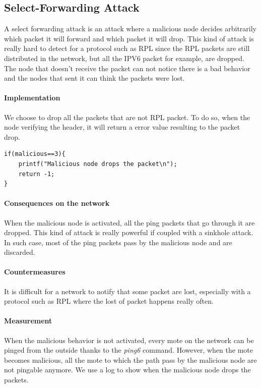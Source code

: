 \documentclass[11pt]{report}
\begin{document}
\subsection{Select-Forwarding Attack}

A select forwarding attack is an attack where a malicious node decides
arbitrarily which packet it will forward and which packet it will drop.
This kind of attack is really hard to detect for a protocol such as
\textsc{RPL} since the \textsc{RPL} packets are still distributed in the
network, but all the IPV6 packet for example, are dropped. The node that
doesn't receive the packet can not notice there is a bad behavior and
the nodes that sent it can think the packets were lost. 


\paragraph{Implementation}
We choose to drop all the packets that are not \textsc{RPL} packet.
To do so, when the node verifying the header, it will return a error
value resulting to the packet drop.


\begin{lstlisting}[caption={SF attack done in the
rpl-ext-header.c file in the method rpl\_verify\_header}]
if(malicious==3){
	printf("Malicious node drops the packet\n");
	return -1;
}	
\end{lstlisting}

\paragraph{Consequences on the network}
When the malicious node is activated, all the ping packets that go
through it are dropped. This kind of attack is really powerful if
coupled with a sinkhole attack. In such case, most of the ping packets
pass by the malicious node and are discarded. 

\paragraph{Countermeasures}
It is difficult for a network to notify that some packet are lost,
especially with a protocol such as \textsc{RPL} where the lost of packet happens
really often. 

\paragraph{Measurement}
When the malicious behavior is not activated, every mote on the network
can be pinged from the outside thanks to the \textit{ping6} command.
However, when the mote becomes malicious, all the mote to which the path
pass by the malicious node are not pingable anymore. We use a log
to show when the malicious node drops the packets.
\end{document}
